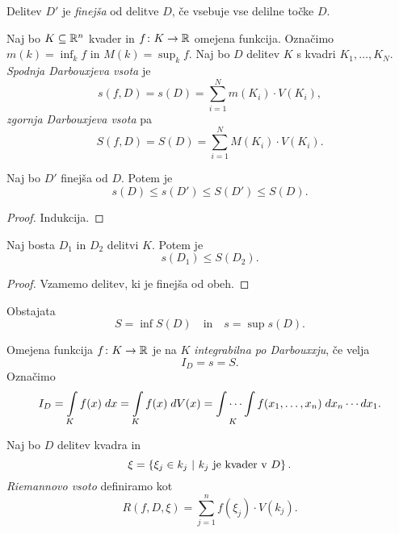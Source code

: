 \begin{definicija}
Delitev $D'$ je \emph{finejša} od
delitve $D$, če vsebuje vse delilne točke $D$.
\end{definicija}

\begin{definicija}
Naj bo $K \subseteq \mathbb{R}^n$ kvader in $f \colon K \to \mathbb{R}$ omejena
funkcija. Označimo
$\displaystyle m(k) = \inf_k f$ in $\displaystyle M(k) = \sup_k f$.
Naj bo $D$ delitev $K$ s kvadri $K_1,\dots,K_N$.
\emph{Spodnja Darbouxjeva vsota} je
\[
s(f,D) = s(D) = \sum_{i=1}^N m(K_i) \cdot V(K_i),
\]
\emph{zgornja Darbouxjeva vsota} pa
\[
S(f,D) = S(D) = \sum_{i=1}^N M(K_i) \cdot V(K_i).
\]
\end{definicija}

\begin{trditev}
Naj bo $D'$ finejša od $D$. Potem je
\[
s(D) \leq s(D') \leq S(D') \leq S(D).
\]
\end{trditev}

\begin{proof}
Indukcija.
\end{proof}

\begin{trditev}
Naj bosta $D_1$ in $D_2$ delitvi $K$. Potem je
\[
s(D_1) \leq S(D_2).
\]
\end{trditev}

\begin{proof}
Vzamemo delitev, ki je finejša od obeh.
\end{proof}

\begin{posledica}
Obstajata
\[
S = \inf S(D) \quad \text{in} \quad s = \sup s(D).
\]
\end{posledica}

\begin{definicija}
Omejena funkcija $f \colon K \to \mathbb{R}$ je na $K$
\emph{integrabilna po Darbouxxju}, če
velja
\[
I_D = s = S.
\]
Označimo
\[
I_D = \int\limits_K f(x)\;dx = \int\limits_K f(x)\;dV(x) =
\idotsint\limits_K f(x_1,\dots,x_n)\;dx_n\cdots dx_1.
\]
\end{definicija}

\begin{definicija}
Naj bo $D$ delitev kvadra in
\[
\xi = \left\{\xi_j \in k_j~\middle\vert~\text{$k_j$ je kvader v $D$}\right\}.
\]
\emph{Riemannovo vsoto} definiramo kot
\[
R(f,D,\xi) = \sum_{j=1}^n f(\xi_j) \cdot V(k_j).
\]
\end{definicija}

